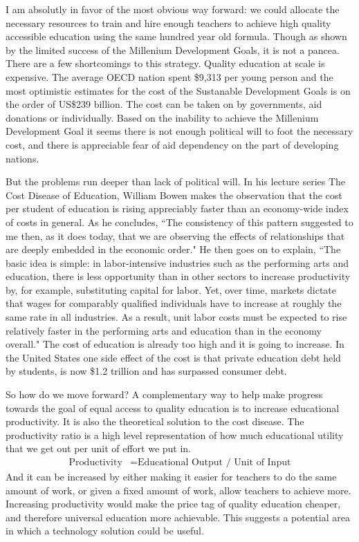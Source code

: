 I am absolutly in favor of the most obvious way forward: we could allocate the necessary resources to train and hire enough teachers to achieve high quality accessible education using the same hundred year old formula. Though as shown by the limited success of the Millenium Development Goals, it is not a pancea. There are a few shortcomings to this strategy. Quality education at scale is expensive. The average OECD nation spent \$9,313 per young person \cite{annualOECDReport} and the most optimistic estimates for the cost of the Sustanable Development Goals is on the order of US\$239 billion. The cost can be taken on by governments, aid donations or individually. Based on the inability to achieve the Millenium Development Goal it seems there is not enough political will to foot the necessary cost, and there is appreciable fear of aid dependency on the part of developing nations. 

But the problems run deeper than lack of political will. In his lecture series The Cost Disease of Education, William Bowen makes the observation that the cost per student of education is rising appreciably faster than an economy-wide index of costs in general. As he concludes, ``The consistency of this pattern suggested to me then, as it does today, that we are observing the effects of relationships that are deeply embedded in the economic order." He then goes on to explain, ``The basic idea is simple: in labor-intensive industries such as
the performing arts and education, there is less opportunity than in other sectors
to increase productivity by, for example, substituting capital for labor. Yet, over
time, markets dictate that wages for comparably qualified individuals have to
increase at roughly the same rate in all industries. As a result, unit labor costs
must be expected to rise relatively faster in the performing arts and education
than in the economy overall." The cost of education is already too high and it is going to increase. In the United States one side effect of the cost is that private education debt held by students, is now \$1.2 trillion and has surpassed consumer debt. 

So how do we move forward? A complementary way to help make progress towards the goal of equal access to quality education is to increase educational productivity. It is also the theoretical solution to the cost disease. The productivity ratio is a high level representation of how much educational utility that we get out per unit of effort we put in. 
\begin{align*}
\text{Productivity} &= \text{Educational Output / Unit of Input} 
\end{align*}
And it can be increased by either making it easier for teachers to do the same amount of work, or given a fixed amount of work, allow teachers to achieve more. Increasing productivity would make the price tag of  quality education cheaper, and therefore universal education more achievable. This suggests a potential area in which a technology solution could be useful. 

